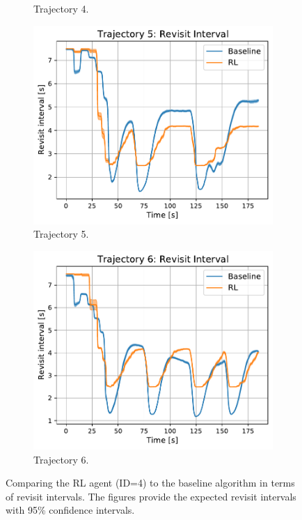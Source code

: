 \documentclass[english, 12pt, a4paper, elec, utf8, a-1b, online]{aaltothesis}
\numberwithin{equation}{section}
\begin{document}
\begin{figure}
\begin{subfigure}[b]{0.45\textwidth}
        \caption{Trajectory 4.}
        \label{fig:RI_T4}
    \end{subfigure}
    \hfill
    \begin{subfigure}[b]{0.45\textwidth}
        \centering
        \includegraphics[width=\linewidth]{figures/benchmark/Simulations/revisit_intervals_4.pdf}
        \caption{Trajectory 5.}
        \label{fig:RI_T5}
    \end{subfigure}
    \hfill
    \begin{subfigure}[b]{0.45\textwidth}
        \centering
        \includegraphics[width=\linewidth]{figures/benchmark/Simulations/revisit_intervals_5.pdf}
        \caption{Trajectory 6.}
        \label{fig:RI_T6}
    \end{subfigure}
    \caption{Comparing the RL agent (ID=4) to the baseline algorithm in terms of revisit intervals. The figures provide the expected revisit intervals with 95\% confidence intervals.}
    \label{fig:revisit_interval_comparison}
\end{figure}
\end{document}
